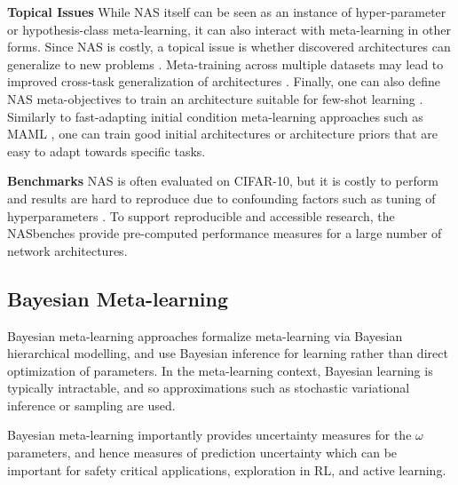 \documentclass[10pt,journal,compsoc]{IEEEtran}
\newcommand{\keypoint}[1]{\vspace{0.1cm}\noindent\textbf{#1}\quad}
\begin{document}
\keypoint{Topical Issues} While NAS itself can be seen as an instance of hyper-parameter or hypothesis-class meta-learning, it can also interact with meta-learning in other forms. Since NAS is costly, a topical issue is whether discovered architectures can generalize to new problems \cite{zoph2018transferrablearchitecture}. Meta-training across multiple datasets may lead to
improved cross-task generalization of architectures \cite{shaw2019meta}. Finally, one can also define NAS meta-objectives to train an architecture suitable for few-shot learning \cite{kim2018autometa,elsken2019metalearning}. Similarly to fast-adapting initial condition meta-learning approaches such as MAML \cite{finn2017maml}, one can train good initial architectures \cite{lian2020towards} or architecture priors \cite{shaw2019meta} that are easy to adapt towards specific tasks.

\keypoint{Benchmarks} NAS is often evaluated on  CIFAR-10, but it is costly to perform and results are hard to reproduce due to confounding factors such as tuning of hyperparameters \cite{li2019random}. To support reproducible and accessible research, the NASbenches \cite{ying2019nasbench} provide pre-computed performance measures for a large number of network architectures.


\subsection{Bayesian Meta-learning}
Bayesian meta-learning approaches formalize meta-learning via Bayesian hierarchical modelling, and use Bayesian inference for learning rather than direct optimization of parameters. In the meta-learning context, Bayesian learning is typically intractable, and so approximations such as stochastic variational inference or sampling are used.


Bayesian meta-learning importantly provides uncertainty measures for the $\omega$ parameters, and hence measures of prediction uncertainty which can be important for safety critical applications, exploration in RL, and active learning.
\end{document}
